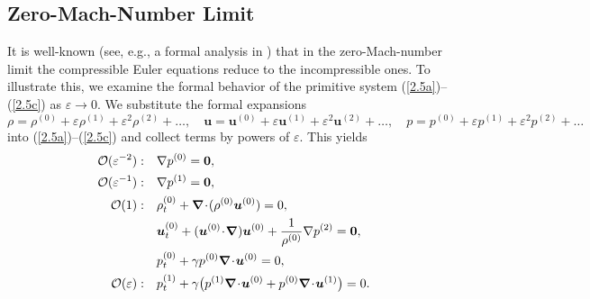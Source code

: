 \documentclass[A4paper,12pt,twoside]{article}
\numberwithin{equation}{section}
\numberwithin{figure}{section}
\numberwithin{table}{section}
\def\bnabla{\bm{\nabla}}
\newcommand{\ve}{\varepsilon}
\newcommand\eref[1]{(\ref{#1})}
\newcommand{\uvec}[2][3]{\boldsymbol{#2\mkern-#1mu}\mkern#1mu}
\begin{document}
\subsection{Zero-Mach-Number Limit}\label{sec22}
It is well-known (see, e.g., a formal analysis in \cite{Ala,MetSch}) that in the zero-Mach-number limit the compressible Euler equations
reduce to the incompressible ones. To illustrate this, we examine the formal behavior of the primitive system \eref{2.5a}--\eref{2.5c} as
$\ve\to0$. We substitute the formal expansions
\begin{equation*}
\rho=\rho^{(0)}+\ve\rho^{(1)}+\ve^2\rho^{(2)}+\dots,\quad\bm u=\bm u^{(0)}+\ve\bm u^{(1)}+\ve^2\bm u^{(2)}+\dots,\quad
p=p^{(0)}+\ve p^{(1)}+\ve^2p^{(2)}+\dots
\end{equation*}
into \eref{2.5a}--\eref{2.5c} and collect terms by powers of $\ve$. This yields
\begin{align}
{\cal O}(\ve^{-2}):\quad&\nabla p^{(0)}=\uvec{0},\label{2.8f}\\
{\cal O}(\ve^{-1}):\quad&\nabla p^{(1)}=\uvec{0},\label{2.9f}\\
{\cal O}(1):\quad&\rho^{(0)}_t+\bnabla\!\cdot\!(\rho^{(0)}\bm u^{(0)})=0,\label{2.10f}\\
&\bm u^{(0)}_t+(\bm u^{(0)}\!\cdot\!\bnabla)\bm u^{(0)}+\frac{1}{\rho^{(0)}}\nabla p^{(2)}=\bm0,\label{2.11f}\\
&p^{(0)}_t+\gamma p^{(0)}\bnabla\!\cdot\!\bm u^{(0)}=0,\label{2.12f}\\
{\cal O}(\ve):\quad&p^{(1)}_t+\gamma\big(p^{(1)}\bnabla\!\cdot\!\bm u^{(0)}+p^{(0)}\bnabla\!\cdot\!\bm u^{(1)}\big)=0.\label{2.13f}
\end{align}
\end{document}

